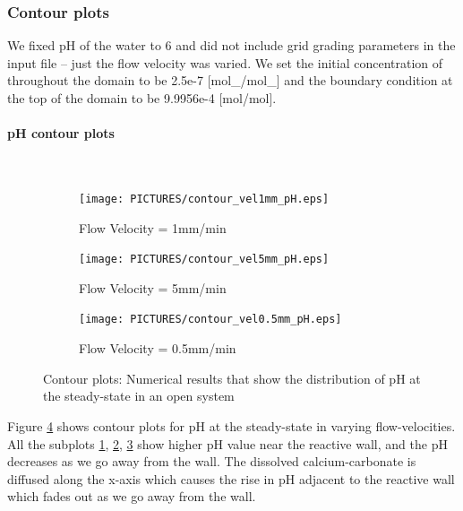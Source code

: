\subsubsection*{Contour plots} \label{ssec:contour}
We fixed pH of the water to 6 and did not include grid grading parameters in the input file -- just the flow velocity was varied. 
We set the initial concentration of  throughout the domain to be 2.5e-7 [mol\_/mol\_] and the boundary condition 
at the top of the domain to be 9.9956e-4 [mol/mol].


\paragraph*{pH contour plots} \mbox{}\\
\begin{figure}[!h]
\centering
    \begin{subfigure}{.5\linewidth}
        \centering
        \texttt{[image: PICTURES/contour\_vel1mm\_pH.eps]}
        \caption{Flow Velocity = 1mm/min}
        \label{fig:pHSteady-state}       %
    \end{subfigure}%
    \hfill
    \begin{subfigure}{.5\linewidth}
        \centering
        \texttt{[image: PICTURES/contour\_vel5mm\_pH.eps]}
        \caption{Flow Velocity = 5mm/min}
        \label{fig:pHSteady-state5mm}       %
    \end{subfigure}%
    \hfill
    \begin{subfigure}{.5\linewidth}
        \centering
        \texttt{[image: PICTURES/contour\_vel0.5mm\_pH.eps]}
        \caption{Flow Velocity = 0.5mm/min}
        \label{fig:pHSteady-state0.5mm}       %
    \end{subfigure}%
    \caption{\DuMuX Contour plots: Numerical results that show the distribution of pH at the steady-state in an open system}
     \label{fig:contourpH}
\end{figure}

Figure \ref{fig:contourpH} shows contour plots for pH at the steady-state in varying flow-velocities. 
All the subplots \ref{fig:pHSteady-state}, \ref{fig:pHSteady-state5mm}, \ref{fig:pHSteady-state0.5mm} show higher pH value near 
the reactive wall, and the pH decreases as we go away from the wall. The dissolved calcium-carbonate is diffused along the x-axis 
which causes the rise in pH adjacent to the reactive wall which fades out as we go away from the wall.


